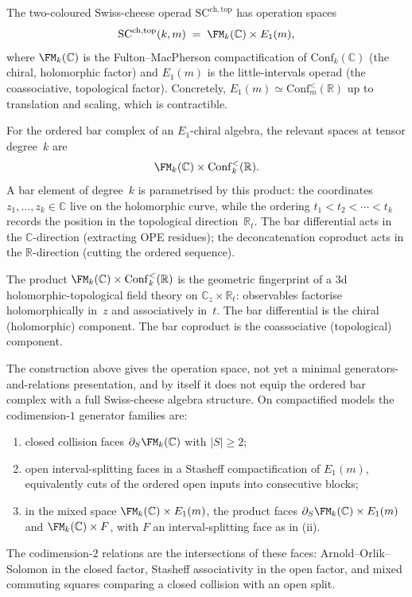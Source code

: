 \begin{construction}
\label{constr:sc-operation-space}
The two-coloured Swiss-cheese operad
$\mathrm{SC}^{\mathrm{ch,top}}$ has operation spaces
\[
\mathrm{SC}^{\mathrm{ch,top}}(k,m)
\;=\;
\FM_k(\mathbb C)\times E_1(m),
\]
where $\FM_k(\mathbb C)$ is the Fulton--MacPherson
compactification of $\mathrm{Conf}_k(\mathbb C)$
(the chiral, holomorphic factor) and $E_1(m)$ is
the little-intervals operad (the coassociative, topological factor).
Concretely, $E_1(m)\simeq \mathrm{Conf}_m^{<}(\mathbb R)$
up to translation and scaling, which is contractible.

For the ordered bar complex of an $E_1$-chiral algebra,
the relevant spaces at tensor degree~$k$ are
\[
\FM_k(\mathbb C)\times \mathrm{Conf}_k^{<}(\mathbb R).
\]
A bar element of degree~$k$ is parametrised by this product:
the coordinates $z_1,\dots,z_k\in\mathbb C$ live on the
holomorphic curve, while the ordering
$t_1<t_2<\cdots<t_k$ records the position in the
topological direction~$\mathbb R_t$. The bar differential
acts in the $\mathbb C$-direction (extracting OPE residues);
the deconcatenation coproduct acts in the $\mathbb R$-direction
(cutting the ordered sequence).
\end{construction}

\begin{remark}
\label{rem:two-colours-geom}
The product $\FM_k(\mathbb C)\times\mathrm{Conf}_k^{<}(\mathbb R)$
is the geometric fingerprint of a 3d holomorphic-topological
field theory on $\mathbb C_z\times\mathbb R_t$:
observables factorise holomorphically in~$z$ and
associatively in~$t$. The bar differential is the
chiral (holomorphic) component. The bar coproduct is the
coassociative (topological) component.
\end{remark}

\begin{remark}
The construction above gives the operation space, not yet a minimal
generators-and-relations presentation, and by itself it does not
equip the ordered bar complex with a full Swiss-cheese algebra
structure. On compactified models the codimension-$1$ generator
families are:
\begin{enumerate}[label=\textup{(\roman*)}]
\item closed collision faces $\partial_S\FM_k(\mathbb C)$ with
 $|S|\ge 2$;
\item open interval-splitting faces in a Stasheff compactification
 of $E_1(m)$, equivalently cuts of the ordered open inputs into
 consecutive blocks;
\item in the mixed space $\FM_k(\mathbb C)\times E_1(m)$, the
 product faces $\partial_S\FM_k(\mathbb C)\times E_1(m)$ and
 $\FM_k(\mathbb C)\times F$, with $F$ an interval-splitting face
 as in \textup{(}ii\textup{)}.
\end{enumerate}
The codimension-$2$ relations are the intersections of these faces:
Arnold--Orlik--Solomon in the closed factor, Stasheff associativity
in the open factor, and mixed commuting squares comparing a closed
collision with an open split.
\end{remark}

